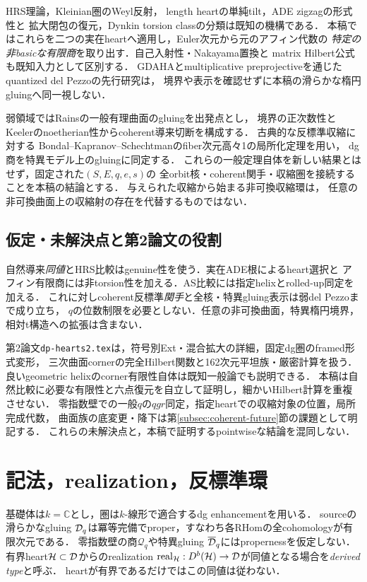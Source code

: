 HRS理論\cite{CHZ}，Kleinian圏のWeyl反射\cite{BridgelandKleinian}，
length heartの単純tilt\cite{BCPW}，ADE zigzagの形式性\cite{LiuWangZigzag}と
拡大閉包の復元\cite{KellerAinf}，Dynkin torsion classの分類\cite{Mizuno}は既知の機構である．
本稿ではこれらを二つの実在heartへ適用し，Euler次元から元のアフィン代数の
\emph{特定の非basicな有限商}を取り出す．自己入射性・Nakayama置換\cite{AiharaMizuno}と
matrix Hilbert公式\cite{EtingofRains}も既知入力として区別する．
GDAHAとmultiplicative preprojectiveを通じたquantized del Pezzoの先行研究\cite{EOR}は，
境界や表示を確認せずに本稿の滑らかな楕円gluingへ同一視しない．

弱領域ではRainsの一般有理曲面のgluingを出発点とし，
境界の正次数性とKeelerのnoetherian性\cite{KeelerAmple}からcoherent導来切断を構成する．
古典的な反標準収縮\cite{DolgachevWalls}に対する
Bondal--Kapranov--Schechtmanのfiber次元高々1の局所化定理\cite[Theorem 2.14]{BKSWalls}を用い，
dg商\cite{DrinfeldWalls}を特異モデル上のgluingに同定する．
これらの一般定理自体を新しい結果とはせず，固定された$(S,E,q,e,s)$の
全orbit核・coherent関手・収縮圏を接続することを本稿の結論とする．
与えられた収縮から始まる非可換収縮環\cite{DonovanWemyssWalls}は，
任意の非可換曲面上の収縮射の存在を代替するものではない．

\subsection{仮定・未解決点と第2論文の役割}
自然導来\emph{同値}とHRS比較はgenuine性を使う．実在ADE根によるheart選択と
アフィン有限商には非torsion性を加える．AS比較には指定helixとrolled-up同定を加える．
これに対しcoherent反標準\emph{関手}と全核・特異gluing表示は弱del Pezzoまで成り立ち，
$q$の位数制限を必要としない．任意の非可換曲面，特異楕円境界，相対t構造への拡張は含まない．

第2論文\texttt{dp-hearts2.tex}は，符号別Ext・混合拡大の詳細，固定dg圏のframed形式変形，
三次曲面cornerの完全Hilbert関数と162次元平坦族・厳密計算を扱う．
良いgeometric helixのcorner有限性自体は既知一般論\cite{dTdVV}でも説明できる．
本稿は自然比較に必要な有限性と六点復元を自立して証明し，細かいHilbert計算を重複させない．
零指数壁での一般$q$の$qgr$同定，指定heartでの収縮対象の位置，局所完成代数，
曲面族の底変更・降下は第\ref{subsec:coherent-future}節の課題として明記する．
これらの未解決点と，本稿で証明するpointwiseな結論を混同しない．

\section{記法，realization，反標準環}\label{sec:setup}
基礎体は$k=\mathbb C$とし，圏は$k$-線形で適合するdg enhancementを用いる．
sourceの滑らかなgluing $\mathcal D_q$は冪等完備でproper，すなわち各RHomの全cohomologyが有限次元である．
零指数壁の商$\mathcal Q_q$や特異gluing $\overline{\mathcal D}_q$にはpropernessを仮定しない．
有界heart$\mathcal H\subset\mathcal D$からのrealization
$\operatorname{real}_{\mathcal H}:D^b(\mathcal H)\to\mathcal D$が同値となる場合を\emph{derived type}と呼ぶ．
heartが有界であるだけではこの同値は従わない．

